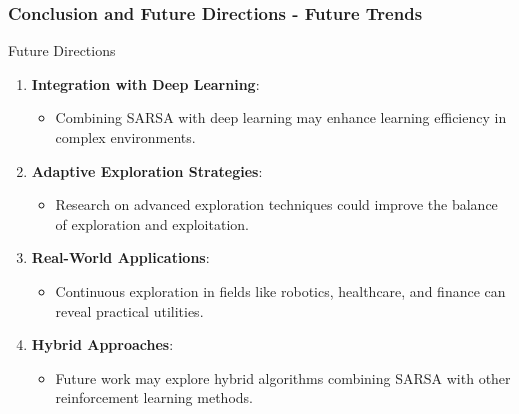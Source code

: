 \documentclass{beamer}
\begin{document}
\begin{frame}[fragile]
    \frametitle{Conclusion and Future Directions - Future Trends}
    \begin{block}{Future Directions}
        \begin{enumerate}
            \item \textbf{Integration with Deep Learning}:
            \begin{itemize}
                \item Combining SARSA with deep learning may enhance learning efficiency in complex environments.
            \end{itemize}
            \item \textbf{Adaptive Exploration Strategies}:
            \begin{itemize}
                \item Research on advanced exploration techniques could improve the balance of exploration and exploitation.
            \end{itemize}
            \item \textbf{Real-World Applications}:
            \begin{itemize}
                \item Continuous exploration in fields like robotics, healthcare, and finance can reveal practical utilities.
            \end{itemize}
            \item \textbf{Hybrid Approaches}:
            \begin{itemize}
                \item Future work may explore hybrid algorithms combining SARSA with other reinforcement learning methods.
            \end{itemize}
        \end{enumerate}
    \end{block}
\end{frame}
\end{document}
